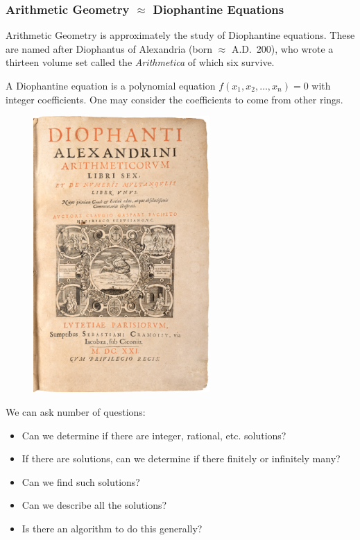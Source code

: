 \begin{frame}[plain] \frametitle{Arithmetic Geometry $\approx$ Diophantine Equations}
{\scriptsize Arithmetic Geometry is approximately the study of Diophantine equations. These are named after Diophantus of Alexandria (born $\approx$ A.D.~200), who wrote a thirteen volume set called the \textit{Arithmetica} of which six survive.}

\begin{dfn} \scriptsize
A Diophantine equation is a polynomial equation $f(x_1, x_2, \ldots, x_n)= 0$ with integer coefficients. One may consider the coefficients to come from other rings. 
\end{dfn}

\begin{minipage}{0.5\textwidth}
	\begin{figure}[ht]
	\centering
	\includegraphics[width=0.6\textwidth]{images/diophantus.png}
	\end{figure}
\end{minipage}\begin{minipage}{0.55\textwidth} \scriptsize
We can ask number of questions:
	\begin{itemize}
	\item Can we determine if there are integer, rational, etc. solutions?
	\item If there are solutions, can we determine if there finitely or infinitely many?
	\item Can we find such solutions?
	\item Can we describe all the solutions?
	\item Is there an algorithm to do this generally?
	\end{itemize}
\end{minipage}
\end{frame}



